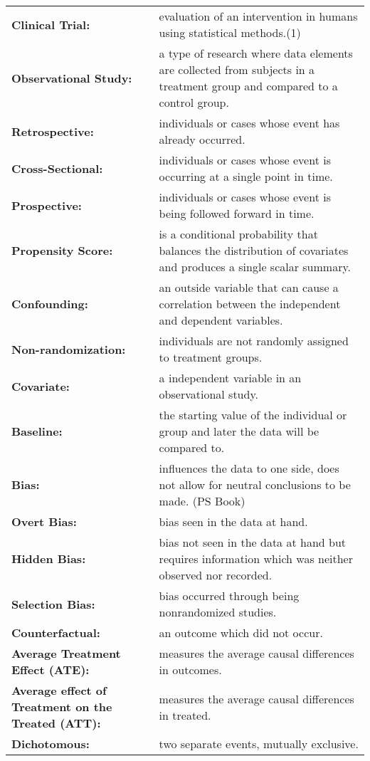 \documentclass[11pt,twocolumn]{article}
\begin{document}
\section{}
\begin{tabular}{>{\bfseries}p{4.5cm}<{\centering}p{7.4cm}}
Clinical Trial: &evaluation of an intervention in humans using statistical methods.(1)\\
Observational Study: &a type of research where data elements are collected from subjects in a treatment group and compared to a control group.\\
Retrospective: &individuals or cases whose event has already occurred.\\
Cross-Sectional: &individuals or cases whose event is occurring at a single point in time.\\
Prospective: &individuals or cases whose event is being followed forward in time.\\
Propensity Score:& is a conditional probability that balances the distribution of covariates and produces a single scalar summary.\\
Confounding: &an outside variable that can cause a correlation between the independent and dependent variables.\\
Non-randomization: &individuals are not randomly assigned to treatment groups.\\
Covariate:& a independent variable in an observational study.\\
Baseline: &the starting value of the individual or group and later the data will be compared to.\\
Bias: &influences the data to one side, does not allow for neutral conclusions to be made. (PS Book)\\
Overt Bias:& bias seen in the data at hand.\\
Hidden Bias: &bias not seen in the data at hand but requires information which was neither observed nor recorded.\\
Selection Bias: &bias occurred through being nonrandomized studies.\\
Counterfactual: &an outcome which did not occur.\\
Average Treatment Effect (ATE):& measures the average causal differences in outcomes.\\
Average effect of Treatment on the Treated (ATT): &measures the average causal differences in treated.\\
Dichotomous: &two separate events, mutually exclusive.
\end{tabular}
 
\end{document}
